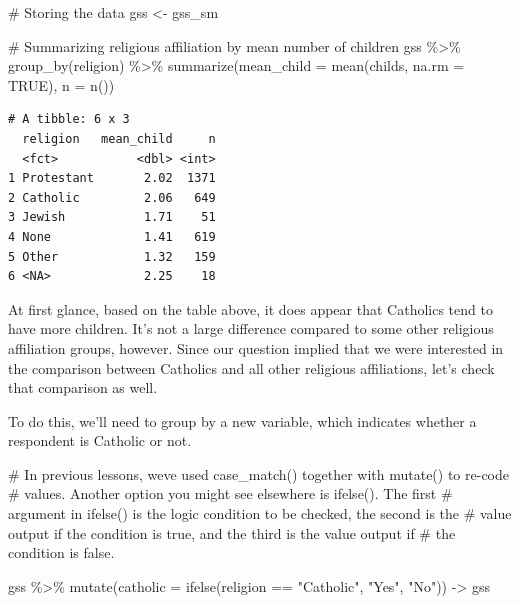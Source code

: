 \documentclass[
  letterpaper,
]{book}
\newenvironment{Shaded}{\begin{snugshade}}{\end{snugshade}}
\newcommand{\AttributeTok}[1]{\textcolor[rgb]{0.40,0.45,0.13}{#1}}
\newcommand{\CommentTok}[1]{\textcolor[rgb]{0.37,0.37,0.37}{#1}}
\newcommand{\ConstantTok}[1]{\textcolor[rgb]{0.56,0.35,0.01}{#1}}
\newcommand{\FunctionTok}[1]{\textcolor[rgb]{0.28,0.35,0.67}{#1}}
\newcommand{\NormalTok}[1]{\textcolor[rgb]{0.00,0.23,0.31}{#1}}
\newcommand{\OtherTok}[1]{\textcolor[rgb]{0.00,0.23,0.31}{#1}}
\newcommand{\SpecialCharTok}[1]{\textcolor[rgb]{0.37,0.37,0.37}{#1}}
\newcommand{\StringTok}[1]{\textcolor[rgb]{0.13,0.47,0.30}{#1}}
\begin{document}
\begin{Shaded}
\begin{Highlighting}[]
\CommentTok{\# Storing the data}
\NormalTok{gss }\OtherTok{\textless{}{-}}\NormalTok{ gss\_sm}

\CommentTok{\# Summarizing religious affiliation by mean number of children}
\NormalTok{gss }\SpecialCharTok{\%\textgreater{}\%}
  \FunctionTok{group\_by}\NormalTok{(religion) }\SpecialCharTok{\%\textgreater{}\%}
  \FunctionTok{summarize}\NormalTok{(}\AttributeTok{mean\_child =} \FunctionTok{mean}\NormalTok{(childs, }\AttributeTok{na.rm =} \ConstantTok{TRUE}\NormalTok{),}
            \AttributeTok{n =} \FunctionTok{n}\NormalTok{())}
\end{Highlighting}
\end{Shaded}

\begin{verbatim}
# A tibble: 6 x 3
  religion   mean_child     n
  <fct>           <dbl> <int>
1 Protestant       2.02  1371
2 Catholic         2.06   649
3 Jewish           1.71    51
4 None             1.41   619
5 Other            1.32   159
6 <NA>             2.25    18
\end{verbatim}

At first glance, based on the table above, it does appear that Catholics
tend to have more children. It's not a large difference compared to some
other religious affiliation groups, however. Since our question implied
that we were interested in the comparison between Catholics and all
other religious affiliations, let's check that comparison as well.

To do this, we'll need to group by a new variable, which indicates
whether a respondent is Catholic or not.

\begin{Shaded}
\begin{Highlighting}[]
\CommentTok{\# In previous lessons, we\textquotesingle{}ve used case\_match() together with mutate() to re{-}code}
\CommentTok{\# values.  Another option you might see elsewhere is ifelse(). The first}
\CommentTok{\# argument in ifelse() is the logic condition to be checked, the second is the }
\CommentTok{\# value output if the condition is true, and the third is the value output if }
\CommentTok{\# the condition is false.}

\NormalTok{gss }\SpecialCharTok{\%\textgreater{}\%} 
  \FunctionTok{mutate}\NormalTok{(}\AttributeTok{catholic =} \FunctionTok{ifelse}\NormalTok{(religion }\SpecialCharTok{==} \StringTok{"Catholic"}\NormalTok{,}
                           \StringTok{"Yes"}\NormalTok{,}
                           \StringTok{"No"}\NormalTok{)) }\OtherTok{{-}\textgreater{}}\NormalTok{ gss}
\end{Highlighting}
\end{Shaded}
\end{document}

